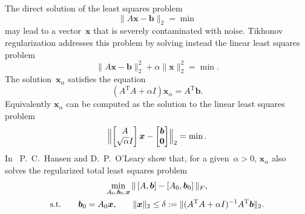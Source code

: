 \documentclass[a4paper,10pt]{amsart}
\newcommand{\trans}[1]{{#1}^{\text{T}}}      %
\renewcommand{\vec}[1]{\mathbf{\boldsymbol{#1}}}
\begin{document}
The direct solution of the least squares problem
\begin{equation*}
  \| A \vec{x} - \vec{b} \|_2 = \min
\end{equation*}
may lead to a vector~$\vec{x}$ that is severely contaminated with noise.
Tikhonov regularization addresses this problem by solving instead the
linear least squares problem
\begin{equation*}
  \| A \vec{x} - \vec{b} \|_2^2 + \alpha \| \vec{x} \|_2^2 = \min.
\end{equation*}
The solution~$\vec{x}_\alpha$ satisfies the equation
\begin{equation*}
  (\trans{A} A + \alpha I) \vec{x}_\alpha = \trans{A} \vec{b}.
\end{equation*}
Equivalently $\vec{x}_\alpha$ can be computed as the solution to
the linear least squares problem
\begin{equation*}
  \Bigl\| \begin{bmatrix}
            A               \\
            \sqrt{\alpha} I
          \end{bmatrix} \vec{x} -
          \begin{bmatrix}
            \vec{b} \\
            \vec{0}
          \end{bmatrix}
  \Bigr\|_2 = \min.
\end{equation*}
In~\cite{Hansen96} P.~C.~Hansen and D.~P.~O'Leary
show that, for a given~${\alpha > 0}$, $\vec{x}_\alpha$
also solves the regularized total least squares problem
\begin{gather*}
  \min_{A_0, \vec{b}_0, \vec{x}}
  \| \left[ A, \vec{b} \right] - \left[ A_0, \vec{b}_0 \right] \|_F, \\
  \text{s.t.\qquad $\vec{b}_0 = A_0 \vec{x}$,\qquad
                   $\| \vec{x} \|_2 \leq \delta :=
                    \| (\trans{A} A + \alpha I)^{-1} \trans{A} \vec{b} \|_2$.}
\end{gather*}
\end{document}
